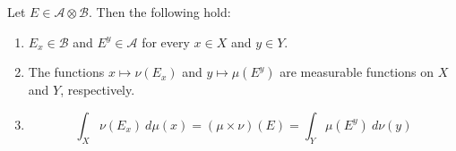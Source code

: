 \begin{theorem}
    Let $E\in\mathscr A\otimes\mathscr B$. Then the following hold: 
    \begin{enumerate}[label=(\alph*)]
    \item $E_x\in\mathscr B$ and $E^y\in\mathscr A$ for every $x\in X$ and $y\in Y$. 
    \item The functions $x\mapsto\nu(E_x)$ and $y\mapsto\mu(E^y)$ are measurable functions on $X$ and $Y$, respectively.
    \item 
    \begin{equation*}
        \int_X\nu(E_x)~d\mu(x) = (\mu\times\nu)(E) = \int_Y\mu(E^y)~d\nu(y)
    \end{equation*}
    \end{enumerate}
\end{theorem}
